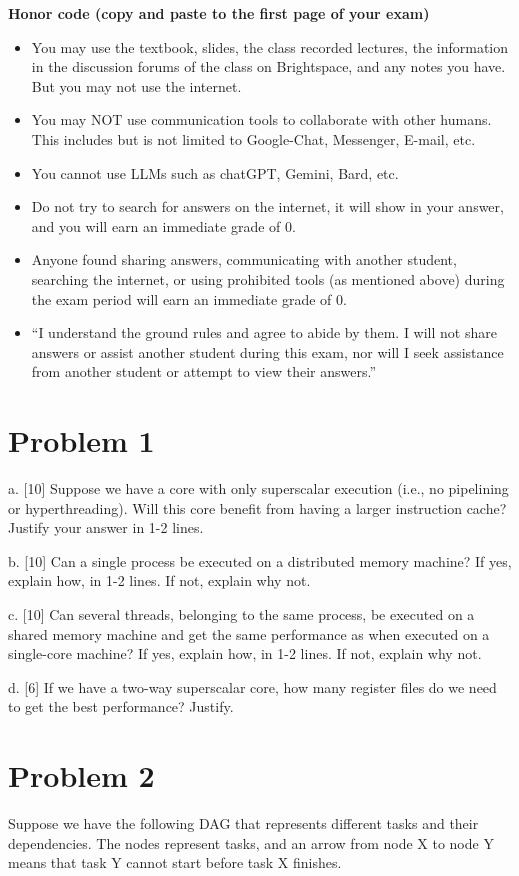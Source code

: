\documentclass{article}
\begin{document}
\hrulefill

\textbf{Honor code (copy and paste to the first page of your exam)}
\begin{itemize}
    \item You may use the textbook, slides, the class recorded lectures, the information in the discussion forums of the class on Brightspace, and any notes you have. But you may not use the internet.
    \item You may NOT use communication tools to collaborate with other humans. This includes but is not limited to Google-Chat, Messenger, E-mail, etc.
    \item You cannot use LLMs such as chatGPT, Gemini, Bard, etc.
    \item Do not try to search for answers on the internet, it will show in your answer, and you will earn an immediate grade of 0.
    \item Anyone found sharing answers, communicating with another student, searching the internet, or using prohibited tools (as mentioned above) during the exam period will earn an immediate grade of 0.
    \item “I understand the ground rules and agree to abide by them. I will not share answers or assist another student during this exam, nor will I seek assistance from another student or attempt to view their answers.”
\end{itemize}

\hrulefill

\section*{Problem 1}
a. [10]  Suppose we have a core with only superscalar execution (i.e., no pipelining or hyperthreading). Will this core benefit from having a larger instruction cache? Justify your answer in 1-2 lines.

b. [10] Can a single process be executed on a distributed memory machine? If yes, explain how, in 1-2 lines. If not, explain why not.

c. [10] Can several threads, belonging to the same process, be executed on a shared memory machine and get the same performance as when executed on a single-core machine? If yes, explain how, in 1-2 lines. If not, explain why not.

d. [6] If we have a two-way superscalar core, how many register files do we need to get the best performance? Justify.


\section*{Problem 2}
Suppose we have the following DAG that represents different tasks and their dependencies.  The nodes represent tasks, and an arrow from node X to node Y means that task Y cannot start before task X finishes.
\end{document}
